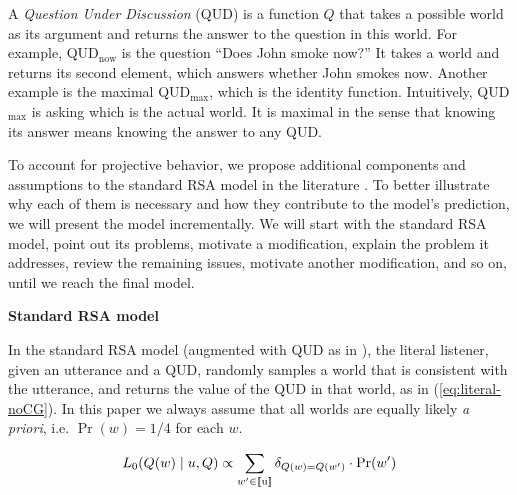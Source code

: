 A \emph{Question Under Discussion} (QUD) is a function $Q$ that takes a possible world as 
 its argument and returns the answer to the question in this world.
For example, QUD$_\textrm{now}$ is the question ``Does John smoke now?'' 
It takes a world and returns its second element, which answers whether 
 John smokes now. 
Another example is the maximal QUD$_\textrm{max}$, which is the identity function. 
Intuitively, QUD$_\textrm{max}$ is asking which is the actual world.
It is maximal in the sense that knowing its answer means knowing the answer to 
 any QUD.
 
To account for projective behavior, we propose 
 additional components and assumptions to the standard RSA model in the literature
 \cite{FrankGoodman2012:Predicting-Pragmatic-Reasoning-,GoodmanStuhlmuller2013:Knowledge-and-I,GoodmanLassiter2015-Chapter}.
To better illustrate why each of them is necessary and how they contribute to 
 the model's prediction, we will present the model incrementally. 
We will start with the standard RSA model, point out its problems, motivate 
 a modification, explain the problem it addresses, review the remaining issues, 
 motivate another modification, and so on, until we reach the final model.

\vspace{1ex}

\noindent\textbf{Standard RSA model}

In the standard RSA model (augmented with QUD as in ), the literal listener, given an utterance and a QUD, 
 randomly samples a world that is consistent with the utterance, 
 and returns the value of the QUD in that world, as in (\ref{eq:literal-noCG}). 
In this paper we always assume that all worlds are equally likely \emph{a priori}, 
 i.e. $\Pr(w)=1/4$ for each $w$.

\vspace{-6pt}
\begin{equation}
L_0(Q(w) \mid u, Q) \propto  \sum_{w'\in \llbracket \text{u} \rrbracket} \delta_{Q(w)=Q(w')} \cdot \Pr(w')  \label{eq:literal-noCG}
\end{equation}

 
